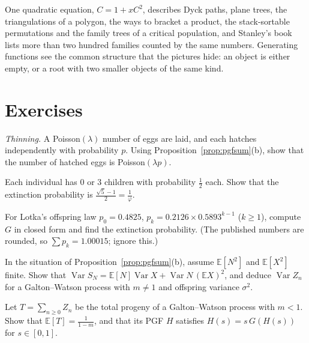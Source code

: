 \begin{beauty}
One quadratic equation, $C=1+xC^2$, describes Dyck paths, plane trees, the triangulations of a polygon, the ways to
bracket a product, the stack-sortable permutations and the family trees of a critical population, and Stanley's
book lists more than two hundred families counted by the same numbers. Generating functions see the common
structure that the pictures hide: an object is either empty, or a root with two smaller objects of the same kind.
\end{beauty}

\section{Exercises}

\begin{exercise}[$\star$]\label{ex:thinning}
\emph{Thinning.} A Poisson$(\lambda)$ number of eggs are laid, and each hatches independently with probability $p$. Using
Proposition~\ref{prop:pgfsum}(b), show that the number of hatched eggs is Poisson$(\lambda p)$.
\end{exercise}

\begin{exercise}[$\star$]\label{ex:golden}
Each individual has $0$ or $3$ children with probability $\frac12$ each. Show that the extinction probability is
$\frac{\sqrt5-1}2=\frac1\varphi$.
\end{exercise}

\begin{exercise}[$\star$]\label{ex:lotka}
For Lotka's offspring law $p_0=0.4825$, $p_k=0.2126\times0.5893^{k-1}$ ($k\ge1$), compute $G$ in closed form and find the
extinction probability. (The published numbers are rounded, so $\sum p_k=1.00015$; ignore this.)
\end{exercise}

\begin{exercise}[$\star\star$]\label{ex:randomsumvar}
In the situation of Proposition~\ref{prop:pgfsum}(b), assume $\mathbb E[N^2]$ and $\mathbb E[X^2]$ finite. Show that
$\operatorname{Var}S_N=\mathbb E[N]\operatorname{Var}X+\operatorname{Var}N\,(\mathbb EX)^2$, and deduce $\operatorname{Var}Z_n$ for a Galton--Watson process with $m\ne1$ and offspring
variance $\sigma^2$.
\end{exercise}

\begin{exercise}[$\star\star$]\label{ex:progeny}
Let $T=\sum_{n\ge0}Z_n$ be the total progeny of a Galton--Watson process with $m<1$. Show that $\mathbb E[T]=\frac1{1-m}$, and that
its PGF $H$ satisfies $H(s)=s\,G(H(s))$ for $s\in[0,1]$.
\end{exercise}


